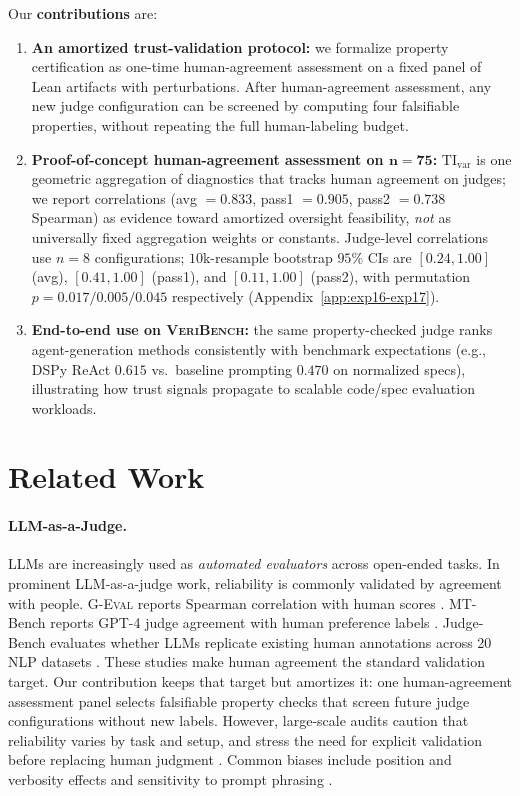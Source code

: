 \documentclass{article}
\begin{document}
Our \textbf{contributions} are:
\begin{enumerate}
  \item \textbf{An amortized trust-validation protocol:} we formalize property certification as one-time human-agreement assessment on a fixed panel of Lean artifacts with perturbations. After human-agreement assessment, any new judge configuration can be screened by computing four falsifiable properties, without repeating the full human-labeling budget.

  \item \textbf{Proof-of-concept human-agreement assessment on \(\bm{n{=}75}\):} \(\mathrm{TI}_{\mathrm{var}}\) is one geometric aggregation of diagnostics that tracks human agreement on judges; we report correlations (avg \(=0.833\), pass1 \(=0.905\), pass2 \(=0.738\) Spearman) as evidence toward amortized oversight feasibility, \emph{not} as universally fixed aggregation weights or constants. Judge-level correlations use \(n{=}8\) configurations; \(10\)k-resample bootstrap \(95\%\) CIs are \([0.24,1.00]\) (avg), \([0.41,1.00]\) (pass1), and \([0.11,1.00]\) (pass2), with permutation \(p=0.017/0.005/0.045\) respectively (Appendix~\ref{app:exp16-exp17}).
  \item \textbf{End-to-end use on \textsc{VeriBench}:} the same property-checked judge ranks agent-generation methods consistently with benchmark expectations (e.g., DSPy ReAct \(0.615\) vs.\ baseline prompting \(0.470\) on normalized specs), illustrating how trust signals propagate to scalable code/spec evaluation workloads.
\end{enumerate}

\section{Related Work}
\paragraph{LLM-as-a-Judge.}
LLMs are increasingly used as \emph{automated evaluators} across open-ended tasks.
In prominent LLM-as-a-judge work, reliability is commonly validated by agreement with people.
\textsc{G-Eval} reports Spearman correlation with human scores \citep{Liu2023GEval}.
MT-Bench reports GPT-4 judge agreement with human preference labels \citep{Zheng2023MTBench}.
Judge-Bench evaluates whether LLMs replicate existing human annotations across 20 NLP datasets \citep{Kocmi2024HumanVsLLM}.
These studies make human agreement the standard validation target.
Our contribution keeps that target but amortizes it: one human-agreement assessment panel selects falsifiable property checks that screen future judge configurations without new labels.
However, large-scale audits caution that reliability varies by task and setup, and stress the need for explicit validation before replacing human judgment \citep{Kocmi2024HumanVsLLM,Li2024TrustLLMJudgments}.
Common biases include position and verbosity effects and sensitivity to prompt phrasing \citep{Zheng2023MTBench,Li2024TrustLLMJudgments}.
\end{document}
